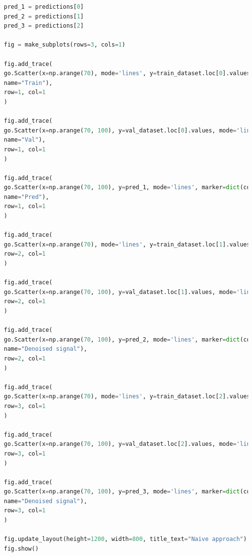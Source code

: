 \documentclass{article}
\begin{document}
\begin{latin}
\begin{lstlisting}[language=Python]
pred_1 = predictions[0]
pred_2 = predictions[1]
pred_3 = predictions[2]

fig = make_subplots(rows=3, cols=1)

fig.add_trace(
go.Scatter(x=np.arange(70), mode='lines', y=train_dataset.loc[0].values, marker=dict(color="dodgerblue"),
name="Train"),
row=1, col=1
)

fig.add_trace(
go.Scatter(x=np.arange(70, 100), y=val_dataset.loc[0].values, mode='lines', marker=dict(color="darkorange"),
name="Val"),
row=1, col=1
)

fig.add_trace(
go.Scatter(x=np.arange(70, 100), y=pred_1, mode='lines', marker=dict(color="seagreen"),
name="Pred"),
row=1, col=1
)

fig.add_trace(
go.Scatter(x=np.arange(70), mode='lines', y=train_dataset.loc[1].values, marker=dict(color="dodgerblue"), showlegend=False),
row=2, col=1
)

fig.add_trace(
go.Scatter(x=np.arange(70, 100), y=val_dataset.loc[1].values, mode='lines', marker=dict(color="darkorange"), showlegend=False),
row=2, col=1
)

fig.add_trace(
go.Scatter(x=np.arange(70, 100), y=pred_2, mode='lines', marker=dict(color="seagreen"), showlegend=False,
name="Denoised signal"),
row=2, col=1
)

fig.add_trace(
go.Scatter(x=np.arange(70), mode='lines', y=train_dataset.loc[2].values, marker=dict(color="dodgerblue"), showlegend=False),
row=3, col=1
)

fig.add_trace(
go.Scatter(x=np.arange(70, 100), y=val_dataset.loc[2].values, mode='lines', marker=dict(color="darkorange"), showlegend=False),
row=3, col=1
)

fig.add_trace(
go.Scatter(x=np.arange(70, 100), y=pred_3, mode='lines', marker=dict(color="seagreen"), showlegend=False,
name="Denoised signal"),
row=3, col=1
)

fig.update_layout(height=1200, width=800, title_text="Naive approach")
fig.show()
\end{lstlisting}
\end{latin}
\end{document}
